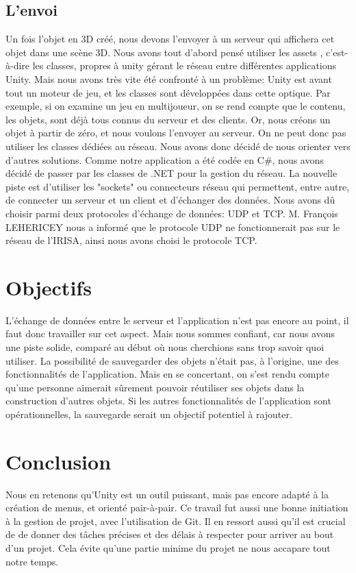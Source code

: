 \documentclass[a4paper,11pt]{article}
\begin{document}
		\subsection{L'envoi}
			Un fois l'objet en 3D créé, nous devons l'envoyer à un serveur qui affichera cet objet dans une scène 3D.
			Nous avons tout d'abord pensé utiliser les assets , c'est-à-dire les classes, propres à unity gérant le réseau entre différentes applications Unity. Mais nous avons très vite été confronté à un problème: Unity est avant tout un moteur de jeu, et les classes sont développées dans cette optique.
			Par exemple, si on examine un jeu en multijoueur, on se rend compte que le contenu, les objets, sont déjà tous connus du serveur et des clients. Or, nous créons un objet à partir de zéro, et nous voulons l'envoyer au serveur. On ne peut donc pas utiliser les classes dédiées au réseau. Nous avons donc décidé de nous orienter vers d'autres solutions.
			Comme notre application a été codée en C\#, nous avons décidé de passer par les classes de .NET pour la gestion du réseau.
			La nouvelle piste est d'utiliser les "sockets" ou connecteurs réseau qui permettent, entre autre, de connecter un serveur et un client et d'échanger des données. Nous avons dû choisir parmi deux protocoles d'échange de données: UDP et TCP.
			M. François LEHERICEY nous a informé que le protocole UDP ne fonctionnerait pas sur le réseau de l'IRISA, ainsi nous avons choisi le protocole TCP.
	\section{Objectifs}
		L'échange de données entre le serveur et l'application n'est pas encore au point, il faut donc travailler sur cet aspect. Mais nous sommes confiant, car nous avons une piste solide, comparé au début où nous cherchions sans trop savoir quoi utiliser.
		La possibilité de sauvegarder des objets n'était pas, à l'origine, une des fonctionnalités de l'application. Mais en se concertant, on s'est rendu compte qu'une personne aimerait sûrement pouvoir réutiliser ses objets dans la construction d'autres objets. Si les autres fonctionnalités de l'application sont opérationnelles, la sauvegarde serait un objectif potentiel à rajouter.
	\section{Conclusion}
			Nous en retenons qu'Unity est un outil puissant, mais pas encore adapté à la création de menus, et orienté pair-à-pair. Ce travail fut aussi une bonne initiation à la gestion de projet, avec l'utilisation de Git. Il en ressort aussi qu'il est crucial de de donner des tâches précises et des délais à respecter pour arriver au bout d'un projet. Cela évite qu'une partie minime du projet ne nous accapare tout notre temps.
			
\end{document}

